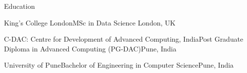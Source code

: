\documentclass{resume} %
\begin{document}
\begin{rSection}{Education}
\begin{rSubsection}{King's College London}{}{MSc in Data Science }{London, UK}
\vspace{-.65cm}
\item[]
\end{rSubsection}
\begin{rSubsection}{C-DAC: Centre for Development of Advanced Computing, India}{}{Post Graduate Diploma in Advanced Computing (PG-DAC)}{Pune, India}
\vspace{-.65cm}
\item[]
\end{rSubsection}
\begin{rSubsection}{University of Pune}{}{Bachelor of Engineering in Computer Science}{Pune, India}
\vspace{-.65cm}
\item[]
\end{rSubsection}
\end{rSection}

\end{document}
